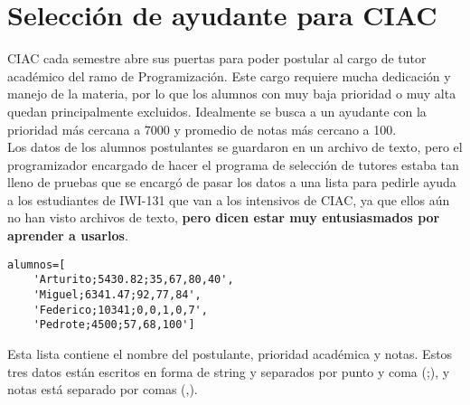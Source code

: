 \section{Selección de ayudante para CIAC}
CIAC cada semestre abre sus puertas para poder postular al cargo de tutor académico del ramo de Programización. Este cargo requiere mucha dedicación y manejo de la materia, por lo que los alumnos con muy baja prioridad o muy alta quedan principalmente excluidos. Idealmente se busca a un ayudante con la prioridad más cercana a 7000 y promedio de notas más cercano a 100.\\

Los datos de los alumnos postulantes se guardaron en un archivo de texto, pero el programizador encargado de hacer el programa de selección de tutores estaba tan lleno de pruebas que se encargó de pasar los datos a una lista para pedirle ayuda a los estudiantes de IWI-131 que van a los intensivos de CIAC, ya que ellos aún no han visto archivos de texto, \textbf{pero dicen estar muy entusiasmados por aprender a usarlos}.\\
\begin{lstlisting}[style=consola]
alumnos=[
    'Arturito;5430.82;35,67,80,40',
    'Miguel;6341.47;92,77,84',
    'Federico;10341;0,0,1,0,7',
    'Pedrote;4500;57,68,100']
\end{lstlisting}

Esta lista contiene el nombre del postulante, prioridad académica y notas. Estos tres datos están escritos en forma de string y separados por punto y coma (;), y notas está separado por comas (,).

